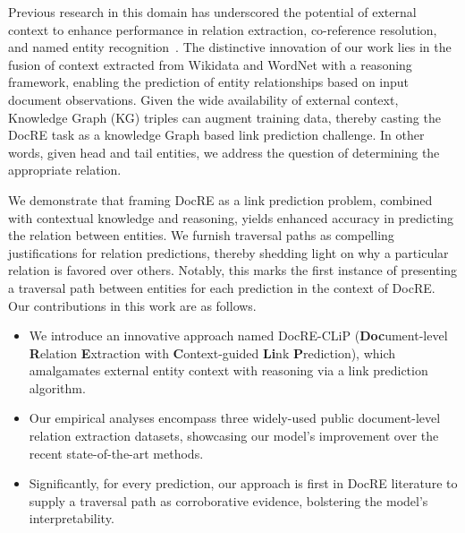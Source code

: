 \documentclass[letterpaper]{article} %
\begin{document}
Previous research in this domain has underscored the potential of external context to enhance performance in relation extraction, co-reference resolution, and named entity recognition~\cite{shimorina-etal-2022-knowledge}.
The distinctive innovation of our work lies in the fusion of context extracted from Wikidata and WordNet with a reasoning framework, enabling the prediction of entity relationships based on input document observations. Given the wide availability of external context, Knowledge Graph (KG) triples can augment training data, thereby casting the DocRE task as a knowledge Graph based link prediction challenge. In other words, given head and tail entities, we address the question of determining the appropriate relation.

We demonstrate that framing DocRE as a link prediction problem, combined with contextual knowledge and reasoning, yields enhanced accuracy in predicting the relation between entities. We furnish traversal paths as compelling justifications for relation predictions, thereby shedding light on why a particular relation is favored over others. Notably, this marks the first instance of presenting a traversal path between entities for each prediction in the context of DocRE. Our contributions in this work are as follows.

\begin{itemize}
  \item We introduce an innovative approach named DocRE-CLiP (\textbf{Doc}ument-level \textbf{R}elation \textbf{E}xtraction with \textbf{C}ontext-guided \textbf{Li}nk \textbf{P}rediction), which amalgamates external entity context with reasoning via a link prediction algorithm.
  \item  Our empirical analyses encompass three widely-used public document-level relation extraction datasets, showcasing our model's improvement over the recent state-of-the-art methods.
  \item Significantly, for every prediction, our approach is first in DocRE literature to supply a traversal path as corroborative evidence, bolstering the model's interpretability.
\end{itemize}
\end{document}
